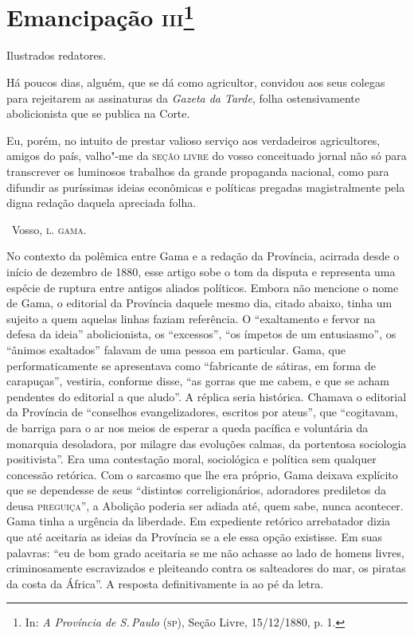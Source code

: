\chapter{Emancipação \textsc{iii}\footnote[*]{In: \emph{A Província de
  S.\,Paulo} (\textsc{sp}), Seção Livre, 15/12/1880, p. 1.}}


Ilustrados redatores.

Há poucos dias, alguém, que se dá como agricultor, convidou aos seus
colegas para rejeitarem as assinaturas da \emph{Gazeta da Tarde}, folha
ostensivamente abolicionista que se publica na Corte.

Eu, porém, no intuito de prestar valioso serviço aos verdadeiros
agricultores, amigos do país, valho"-me da \textsc{seção livre} do vosso
conceituado jornal não só para transcrever os luminosos trabalhos da
grande propaganda nacional, como para difundir as puríssimas ideias
econômicas e políticas pregadas magistralmente pela digna redação
daquela apreciada folha.

\bigskip

\hfill\ Vosso, \textsc{l. gama.}

\pagebreak
\mbox{}\vfill
\thispagestyle{empty}

{\small\noindent
No contexto da polêmica entre Gama e a redação da Província,
acirrada desde o início de dezembro de 1880, esse artigo sobe o tom da
disputa e representa uma espécie de ruptura entre antigos aliados
políticos. Embora não mencione o nome de Gama, o editorial da Província
daquele mesmo dia, citado abaixo, tinha um sujeito
a quem aquelas linhas faziam referência. O
``exaltamento e fervor na defesa da ideia'' abolicionista, os ``excessos'',
``os ímpetos de um entusiasmo'', os ``ânimos exaltados'' falavam de uma
pessoa em particular. Gama, que performaticamente se apresentava como
``fabricante de sátiras, em forma de carapuças'', vestiria, conforme
disse, ``as gorras que me cabem, e que se acham pendentes do editorial a
que aludo''. A réplica seria histórica. Chamava o editorial da Província
de ``conselhos evangelizadores, escritos por ateus'', que ``cogitavam, de
barriga para o ar nos meios de esperar a queda pacífica e voluntária da
monarquia desoladora, por milagre das evoluções calmas, da portentosa
sociologia positivista''. Era uma contestação moral, sociológica e
política sem qualquer concessão retórica. Com o sarcasmo que lhe era
próprio, Gama deixava explícito que se dependesse de seus ``distintos
correligionários, adoradores prediletos da deusa \textsc{preguiça}'', a Abolição
poderia ser adiada até, quem sabe, nunca acontecer.
Gama tinha a urgência da liberdade. Em expediente retórico arrebatador
dizia que até aceitaria as ideias da Província se a ele essa opção
existisse. Em suas palavras: ``eu de bom grado aceitaria se me não
achasse ao lado de homens livres, criminosamente escravizados e
pleiteando contra os salteadores do mar, os piratas da costa da África''.
A resposta definitivamente ia ao pé da letra. }

